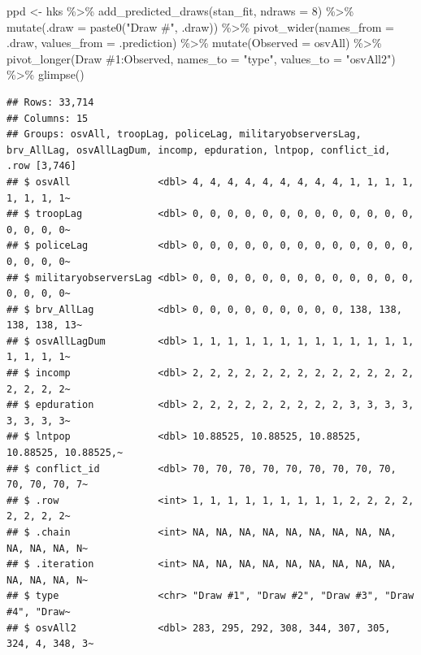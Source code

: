 \documentclass[
]{book}
\newenvironment{Shaded}{\begin{snugshade}}{\end{snugshade}}
\newcommand{\AttributeTok}[1]{\textcolor[rgb]{0.77,0.63,0.00}{#1}}
\newcommand{\DecValTok}[1]{\textcolor[rgb]{0.00,0.00,0.81}{#1}}
\newcommand{\FunctionTok}[1]{\textcolor[rgb]{0.00,0.00,0.00}{#1}}
\newcommand{\NormalTok}[1]{#1}
\newcommand{\OtherTok}[1]{\textcolor[rgb]{0.56,0.35,0.01}{#1}}
\newcommand{\SpecialCharTok}[1]{\textcolor[rgb]{0.00,0.00,0.00}{#1}}
\newcommand{\StringTok}[1]{\textcolor[rgb]{0.31,0.60,0.02}{#1}}
\begin{document}
\begin{Shaded}
\begin{Highlighting}[]
\NormalTok{ppd }\OtherTok{\textless{}{-}}\NormalTok{ hks }\SpecialCharTok{\%\textgreater{}\%}
  \FunctionTok{add\_predicted\_draws}\NormalTok{(stan\_fit, }\AttributeTok{ndraws =} \DecValTok{8}\NormalTok{) }\SpecialCharTok{\%\textgreater{}\%} 
  \FunctionTok{mutate}\NormalTok{(}\AttributeTok{.draw =} \FunctionTok{paste0}\NormalTok{(}\StringTok{"Draw \#"}\NormalTok{, .draw)) }\SpecialCharTok{\%\textgreater{}\%} 
  \FunctionTok{pivot\_wider}\NormalTok{(}\AttributeTok{names\_from =}\NormalTok{ .draw, }\AttributeTok{values\_from =}\NormalTok{ .prediction) }\SpecialCharTok{\%\textgreater{}\%}
  \FunctionTok{mutate}\NormalTok{(}\StringTok{\textasciigrave{}}\AttributeTok{Observed}\StringTok{\textasciigrave{}} \OtherTok{=}\NormalTok{ osvAll) }\SpecialCharTok{\%\textgreater{}\%} 
  \FunctionTok{pivot\_longer}\NormalTok{(}\StringTok{\textasciigrave{}}\AttributeTok{Draw \#1}\StringTok{\textasciigrave{}}\SpecialCharTok{:}\StringTok{\textasciigrave{}}\AttributeTok{Observed}\StringTok{\textasciigrave{}}\NormalTok{, }\AttributeTok{names\_to =} \StringTok{"type"}\NormalTok{, }\AttributeTok{values\_to =} \StringTok{"osvAll2"}\NormalTok{) }\SpecialCharTok{\%\textgreater{}\%}
  \FunctionTok{glimpse}\NormalTok{()}
\end{Highlighting}
\end{Shaded}

\begin{verbatim}
## Rows: 33,714
## Columns: 15
## Groups: osvAll, troopLag, policeLag, militaryobserversLag, brv_AllLag, osvAllLagDum, incomp, epduration, lntpop, conflict_id, .row [3,746]
## $ osvAll               <dbl> 4, 4, 4, 4, 4, 4, 4, 4, 4, 1, 1, 1, 1, 1, 1, 1, 1~
## $ troopLag             <dbl> 0, 0, 0, 0, 0, 0, 0, 0, 0, 0, 0, 0, 0, 0, 0, 0, 0~
## $ policeLag            <dbl> 0, 0, 0, 0, 0, 0, 0, 0, 0, 0, 0, 0, 0, 0, 0, 0, 0~
## $ militaryobserversLag <dbl> 0, 0, 0, 0, 0, 0, 0, 0, 0, 0, 0, 0, 0, 0, 0, 0, 0~
## $ brv_AllLag           <dbl> 0, 0, 0, 0, 0, 0, 0, 0, 0, 138, 138, 138, 138, 13~
## $ osvAllLagDum         <dbl> 1, 1, 1, 1, 1, 1, 1, 1, 1, 1, 1, 1, 1, 1, 1, 1, 1~
## $ incomp               <dbl> 2, 2, 2, 2, 2, 2, 2, 2, 2, 2, 2, 2, 2, 2, 2, 2, 2~
## $ epduration           <dbl> 2, 2, 2, 2, 2, 2, 2, 2, 2, 3, 3, 3, 3, 3, 3, 3, 3~
## $ lntpop               <dbl> 10.88525, 10.88525, 10.88525, 10.88525, 10.88525,~
## $ conflict_id          <dbl> 70, 70, 70, 70, 70, 70, 70, 70, 70, 70, 70, 70, 7~
## $ .row                 <int> 1, 1, 1, 1, 1, 1, 1, 1, 1, 2, 2, 2, 2, 2, 2, 2, 2~
## $ .chain               <int> NA, NA, NA, NA, NA, NA, NA, NA, NA, NA, NA, NA, N~
## $ .iteration           <int> NA, NA, NA, NA, NA, NA, NA, NA, NA, NA, NA, NA, N~
## $ type                 <chr> "Draw #1", "Draw #2", "Draw #3", "Draw #4", "Draw~
## $ osvAll2              <dbl> 283, 295, 292, 308, 344, 307, 305, 324, 4, 348, 3~
\end{verbatim}
\end{document}
